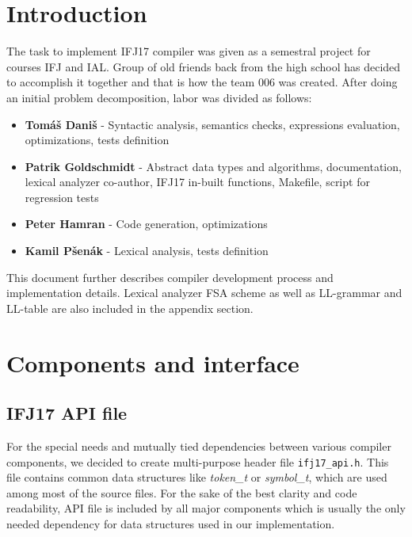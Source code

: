 \documentclass[a4paper, 11pt]{article}
\begin{document}
\makeatother
\newpage
{\large \tableofcontents}

\newpage
{}		%
\setcounter{page}{1}

\section{Introduction}
The task to implement IFJ17 compiler was given as a semestral project for courses IFJ and IAL. Group of old friends back from the high school has decided to accomplish it together and that is how the team 006 was created. After doing an initial problem decomposition, labor was divided as follows:
\begin{itemize}
	\item \textbf{Tomáš Daniš} - Syntactic analysis, semantics checks, expressions evaluation, optimizations, tests definition
	\item \textbf{Patrik Goldschmidt} - Abstract data types and algorithms, documentation, lexical analyzer co-author, IFJ17 in-built functions, Makefile, script for regression tests
	\item \textbf{Peter Hamran} - Code generation, optimizations
	\item \textbf{Kamil Pšenák} - Lexical analysis, tests definition
\end{itemize}

This document further describes compiler development process and implementation details. Lexical analyzer FSA scheme as well as LL-grammar and LL-table are also included in the appendix section. 

\section{Components and interface}

\subsection{IFJ17 API file}

For the special needs and mutually tied dependencies between various compiler components, we decided to create multi-purpose header file \texttt{ifj17\_api.h}. This file contains common data structures like \emph{token\_t} or \emph{symbol\_t}, which are used among most of the source files. For the sake of the best clarity and code readability, API file is included by all major components which is usually the only needed dependency for data structures used in our implementation.
\end{document}
